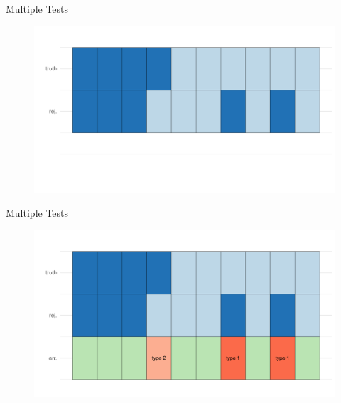 \documentclass[xcolor={pdftex,dvipsnames,table}]{beamer}
\begin{document}
\begin{frame}{Multiple Tests}
    \begin{figure}
        \centering
        \includegraphics[width = 1.1\textwidth]{Slides/MTP/plaatjes/mt2.pdf}
    \end{figure}
\end{frame}

\begin{frame}{Multiple Tests}
    \begin{figure}
        \centering
        \includegraphics[width = 1.1\textwidth]{Slides/MTP/plaatjes/mt3.pdf}

    \end{figure}
\end{frame}
\end{document}
